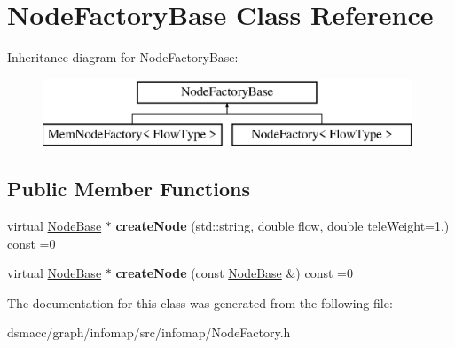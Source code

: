 \hypertarget{classNodeFactoryBase}{}\section{Node\+Factory\+Base Class Reference}
\label{classNodeFactoryBase}
Inheritance diagram for Node\+Factory\+Base\+:\begin{figure}[H]
\begin{center}
\leavevmode
\includegraphics[height=2.000000cm]{classNodeFactoryBase}
\end{center}
\end{figure}
\subsection*{Public Member Functions}
\begin{DoxyCompactItemize}
\item 
\mbox{\label{classNodeFactoryBase_a5bbcea1b675e5748c1f8571f75cba292}} 
virtual \mbox{\hyperlink{classNodeBase}{Node\+Base}} $\ast$ {\bfseries create\+Node} (std\+::string, double flow, double tele\+Weight=1.) const =0
\item 
\mbox{\label{classNodeFactoryBase_af30566f0c6807d0cb9ce0c6c25a256d3}} 
virtual \mbox{\hyperlink{classNodeBase}{Node\+Base}} $\ast$ {\bfseries create\+Node} (const \mbox{\hyperlink{classNodeBase}{Node\+Base}} \&) const =0
\end{DoxyCompactItemize}


The documentation for this class was generated from the following file\+:\begin{DoxyCompactItemize}
\item 
dsmacc/graph/infomap/src/infomap/Node\+Factory.\+h\end{DoxyCompactItemize}
